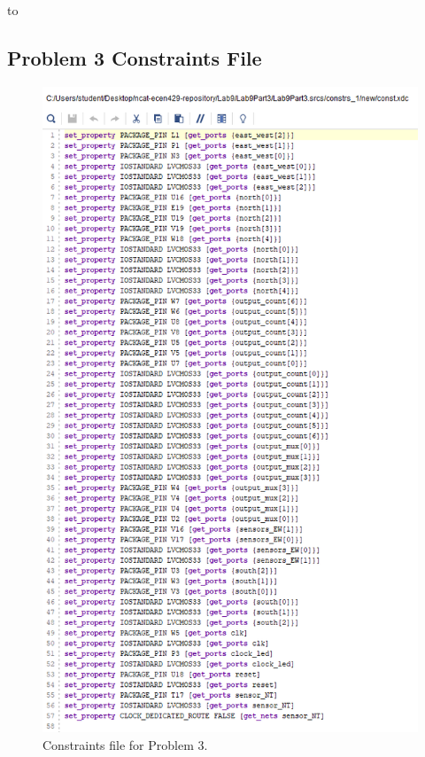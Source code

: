 to\documentclass[11pt]{article}
\begin{document}
\begin{appendices}
\section{Problem 3 Constraints File}
\begin{center}
\begin{figure}[H]
	\includegraphics[scale=0.7]{./images/l9p3const.png}
	\caption{\label{fig:Prob3Const}Constraints file for Problem 3.}
\end{figure}
\end{center}

\end{appendices}
\end{document}
